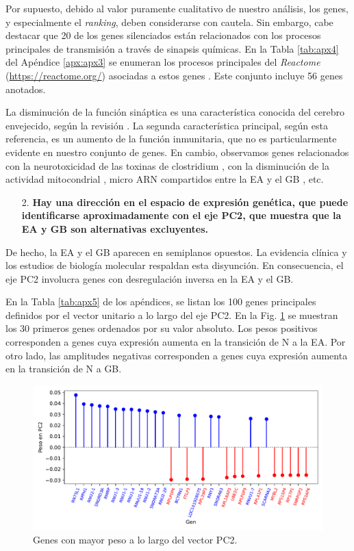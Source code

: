 Por supuesto, debido al valor puramente cualitativo de nuestro análisis, los genes, y especialmente el \textit{ranking}, deben considerarse con cautela. Sin embargo, cabe destacar que 20 de los genes silenciados están relacionados con los procesos principales de transmisión a través de sinapsis químicas. En la Tabla \ref{tab:apx4} del Apéndice \ref{apx:apx3} se enumeran los procesos principales del \textit{Reactome} (\href{https://reactome.org/}{https://reactome.org/}) asociadas a estos genes \cite{Gillespie_2021}. Este conjunto incluye 56 genes anotados.

La disminución de la función sináptica es una característica conocida del cerebro envejecido, según la revisión \cite{Ham_2020}. La segunda característica principal, según esta referencia, es un aumento de la función inmunitaria, que no es particularmente evidente en nuestro conjunto de genes. En cambio, observamos genes relacionados con la neurotoxicidad de las toxinas de clostridium \cite{Biazzo_2022}, con la disminución de la actividad mitocondrial \cite{Sun_2016}, micro ARN compartidos entre la EA y el GB \cite{Thomas_2020}, etc.

\begin{enumerate}
	\item[2.] \textbf{Hay una dirección en el espacio de expresión genética, que puede identificarse aproximadamente con el eje PC2, que muestra que la EA y GB son alternativas excluyentes.}
\end{enumerate}

De hecho, la EA y el GB aparecen en semiplanos opuestos. La evidencia clínica \cite{ou2012does, Driver_2012, Roe_2010, Musicco_2013} y los estudios de biología molecular \cite{Liu_2013, Lanni_2020} respaldan esta disyunción. En consecuencia, el eje PC2 involucra genes con desregulación inversa en la EA y el GB.

En la Tabla \ref{tab:apx5} de los apéndices, se listan los 100 genes principales definidos por el vector unitario a lo largo del eje PC2. En la Fig. \ref{fig:figpc2} se muestran los 30 primeros genes ordenados por su valor absoluto. Los pesos positivos corresponden a genes cuya expresión aumenta en la transición de N a la EA. Por otro lado, las amplitudes negativas corresponden a genes cuya expresión aumenta en la transición de N a GB.

\begin{figure}[!htb]
	\centering
	\includegraphics[width=\linewidth]{figures/PC2}
	\caption{Genes con mayor peso a lo largo del vector PC2.}
	\label{fig:figpc2}
\end{figure}

